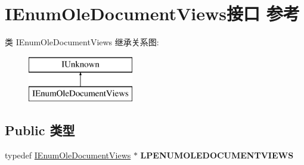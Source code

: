 \hypertarget{interface_i_enum_ole_document_views}{}\section{I\+Enum\+Ole\+Document\+Views接口 参考}
\label{interface_i_enum_ole_document_views}
类 I\+Enum\+Ole\+Document\+Views 继承关系图\+:\begin{figure}[H]
\begin{center}
\leavevmode
\includegraphics[height=2.000000cm]{interface_i_enum_ole_document_views}
\end{center}
\end{figure}
\subsection*{Public 类型}
\begin{DoxyCompactItemize}
\item 
\mbox{\label{interface_i_enum_ole_document_views_a206f09bfbc7f0a7f94806cc7246781e9}} 
typedef \hyperlink{interface_i_enum_ole_document_views}{I\+Enum\+Ole\+Document\+Views} $\ast$ {\bfseries L\+P\+E\+N\+U\+M\+O\+L\+E\+D\+O\+C\+U\+M\+E\+N\+T\+V\+I\+E\+WS}
\end{DoxyCompactItemize}

